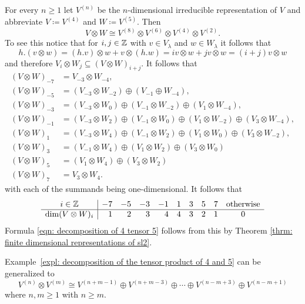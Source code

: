 \begin{expl}\label{expl: decomposition of the tensor product of 4 and 5}
 For every $n \geq 1$ let $V^{(n)}$ be the $n$-dimensional irreducible representation of $V$ and abbreviate $V \coloneqq V^{(4)}$ and $W \coloneqq V^{(5)}$. Then
 \begin{equation}\label{eqn: decomposition of 4 tensor 5}
  V \otimes W \cong V^{(8)} \otimes V^{(6)} \otimes V^{(4)} \otimes V^{(2)}.
 \end{equation}
 To see this notice that for $i,j \in \mathbb{Z}$ with $v \in V_\lambda$ and $w \in W_\lambda$ it follows that
 \[
  h.(v \otimes w)
  = (h.v) \otimes w + v \otimes (h.w)
  = iv \otimes w + jv \otimes w
  = (i+j) v \otimes w
 \]
 and therefore $V_i \otimes W_j \subseteq (V \otimes W)_{i+j}$. It follows that
 \begin{align*}
  (V \otimes W)_{-7}
  &= V_{-3} \otimes W_{-4}, \\
  (V \otimes W)_{-5}
  &= (V_{-3} \otimes W_{-2}) \oplus (V_{-1} \oplus W_{-4}), \\
  (V \otimes W)_{-3}
  &= (V_{-3} \otimes W_0) \oplus (V_{-1} \otimes W_{-2}) \oplus (V_1 \otimes W_{-4}), \\
  (V \otimes W)_{-1}
  &= (V_{-3} \otimes W_2) \oplus (V_{-1} \otimes W_0) \oplus (V_1 \otimes W_{-2}) \oplus (V_3 \otimes W_{-4}), \\
  (V \otimes W)_1
  &= (V_{-3} \otimes W_4) \oplus (V_{-1} \otimes W_2) \oplus (V_1 \otimes W_0) \oplus (V_3 \otimes W_{-2}), \\
  (V \otimes W)_3
  &= (V_{-1} \otimes W_4) \oplus (V_1 \otimes W_2) \oplus (V_3 \otimes W_0) \\
  (V \otimes W)_5
  &= (V_1 \otimes W_4) \oplus (V_3 \otimes W_2) \\
  (V \otimes W)_7
  &= V_3 \otimes W_4.
 \end{align*}
 with each of the summands being one-dimensional. It follows that
 \[
  \begin{array}{c|rrrrrrrrc}
   i \in \mathbb{Z}             & -7 & -5 & -3 & -1 & 1 & 3 & 5 & 7 & \text{otherwise} \\
   \hline
   \dim (V \otimes W)_i &  1 &  2 &  3 &  4 & 4 & 3 & 2 & 1 & 0
  \end{array}
 \]
 Formula \eqref{eqn: decomposition of 4 tensor 5} follows from this by Theorem \ref{thrm: finite dimensional representations of sl2}.
\end{expl}


\begin{rem}
 Example~\ref{expl: decomposition of the tensor product of 4 and 5} can be generalized to
 \[
  V^{(n)} \otimes V^{(m)}
  \cong V^{(n+m-1)} \oplus V^{(n+m-3)} \oplus \dotsb \oplus V^{(n-m+3)} \oplus V^{(n-m+1)}
 \]
 where $n, m \geq 1$ with $n \geq m$.
\end{rem}


















